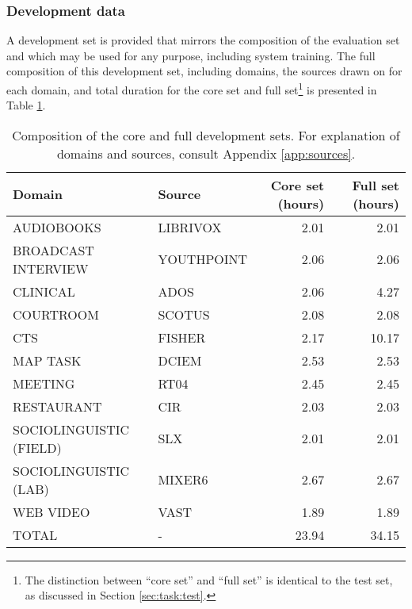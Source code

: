 \documentclass{article}
\begin{document}
\subsubsection{Development data}
A development set is provided that mirrors the composition of the evaluation set and which may be used for any purpose, including system training. The full composition of this development set, including domains, the sources drawn on for each domain, and total duration for the core set and full set\footnote{The distinction between ``core set'' and ``full set'' is identical to the test set, as discussed in Section \ref{sec:task:test}.} is presented in Table \ref{tab:single_chan_dev_set}.
\begin{table}[H]
    \centering
        \begin{tabular}{llrr}
        \hline
         {\bf Domain}               & {\bf Source} &  {\bf Core set (hours)} &   {\bf Full set (hours)} \\
        \hline
         AUDIOBOOKS                 & LIBRIVOX     &  2.01                   &        2.01 \\
         BROADCAST INTERVIEW        & YOUTHPOINT   &  2.06                   &        2.06 \\
         CLINICAL                   & ADOS         &  2.06                   &        4.27 \\
         COURTROOM                  & SCOTUS       &  2.08                   &        2.08 \\
         CTS                        & FISHER       &  2.17                   &       10.17 \\
         MAP TASK                   & DCIEM        &  2.53                   &        2.53 \\
         MEETING                    & RT04         &  2.45                   &        2.45 \\
        RESTAURANT                  & CIR          &  2.03                   &        2.03 \\
         SOCIOLINGUISTIC (FIELD)    & SLX          &  2.01                   &        2.01 \\
         SOCIOLINGUISTIC (LAB)      & MIXER6       &  2.67                   &        2.67 \\
         WEB VIDEO                  & VAST         &  1.89                   &        1.89 \\
         \hline
         TOTAL                      & -            &  23.94                  &       34.15 \\
        \hline
        \end{tabular}
    \caption{Composition of the core and full development sets. For explanation of domains and sources, consult Appendix \ref{app:sources}.}
    \label{tab:single_chan_dev_set}
\end{table}
\end{document}
